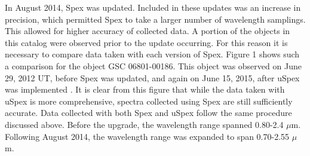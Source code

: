 In August 2014, Spex was updated.  Included in these updates was an increase in precision, which permitted Spex to take a larger number of  wavelength samplings.  This allowed for higher accuracy of collected data.  A portion of the objects in this catalog were observed prior to the update occurring.  For this reason it is necessary to compare data taken with each version of Spex. Figure 1 shows such a comparison for the object GSC 06801-00186.  This object was observed on June 29, 2012 UT, before Spex was updated, and again on June 15, 2015, after uSpex was implemented \cite{Spextool_Manual_Cushing_2015}.  It is clear from this figure that while the data taken with uSpex is more comprehensive, spectra collected using Spex are still sufficiently accurate.  Data collected with both Spex and uSpex follow the same procedure discussed above.  Before the upgrade, the wavelength range spanned 0.80-2.4 $\mu$m.  Following August 2014, the wavelength range was expanded to span 0.70-2.55 $\mu$m.\\

